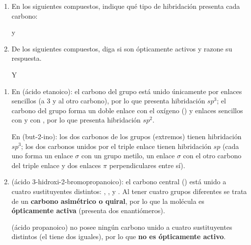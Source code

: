 \begin{exerciseEVAU}
    \begin{enumerate}[label=\letraminuscula]
        \item En los siguientes compuestos, indique qué tipo de hibridación presenta cada carbono:

          y  
        \item De los siguientes compuestos, diga si son ópticamente activos y razone su respuesta.

         Y 
    \end{enumerate}

    \begin{solu}
        \begin{enumerate}[label=\letraminuscula]
            \item En  (ácido etanoico): el carbono del grupo  está unido únicamente por enlaces sencillos (a 3  y al otro carbono), por lo que presenta hibridación \(sp^3\); el carbono del grupo  forma un doble enlace con el oxígeno () y enlaces sencillos con  y con , por lo que presenta hibridación \(sp^2\).

            En  (but-2-ino): los dos carbonos de los grupos  (extremos) tienen hibridación \(sp^3\); los dos carbonos unidos por el triple enlace  tienen hibridación \(sp\) (cada uno forma un enlace \(\sigma\) con un grupo metilo, un enlace \(\sigma\) con el otro carbono del triple enlace y dos enlaces \(\pi\) perpendiculares entre sí).

            \item {} (ácido 3-hidroxi-2-bromopropanoico): el carbono central () está unido a cuatro sustituyentes distintos: , ,  y . Al tener cuatro grupos diferentes se trata de un \textbf{carbono asimétrico o quiral}, por lo que la molécula es \textbf{ópticamente activa} (presenta dos enantiómeros).

             (ácido propanoico) no posee ningún carbono unido a cuatro sustituyentes distintos (el  tiene dos  iguales), por lo que \textbf{no es ópticamente activo}.
        \end{enumerate}
    \end{solu}
\end{exerciseEVAU}

